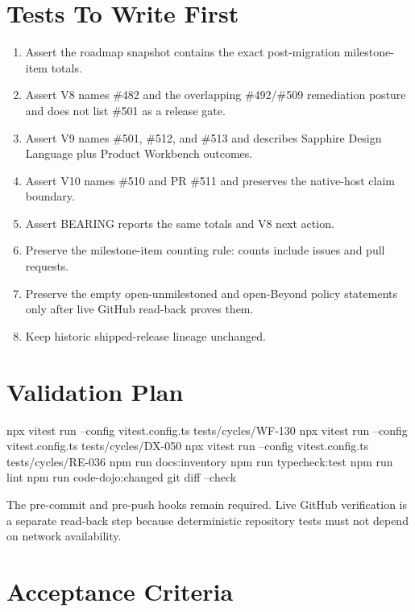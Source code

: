 \section{Tests To Write First}\label{record-249-tests-to-write-first}

\begin{enumerate}
\def\labelenumi{\arabic{enumi}.}
\tightlist
\item
  Assert the roadmap snapshot contains the exact post-migration milestone-item totals.
\item
  Assert V8 names \#482 and the overlapping \#492/\#509 remediation posture and does not list \#501 as a release gate.
\item
  Assert V9 names \#501, \#512, and \#513 and describes Sapphire Design Language plus Product Workbench outcomes.
\item
  Assert V10 names \#510 and PR \#511 and preserves the native-host claim boundary.
\item
  Assert BEARING reports the same totals and V8 next action.
\item
  Preserve the milestone-item counting rule: counts include issues and pull requests.
\item
  Preserve the empty open-unmilestoned and open-Beyond policy statements only after live GitHub read-back proves them.
\item
  Keep historic shipped-release lineage unchanged.
\end{enumerate}

\section{Validation Plan}\label{record-249-validation-plan}

\begin{CodeBlock}
npx vitest run --config vitest.config.ts tests/cycles/WF-130
npx vitest run --config vitest.config.ts tests/cycles/DX-050
npx vitest run --config vitest.config.ts tests/cycles/RE-036
npm run docs:inventory
npm run typecheck:test
npm run lint
npm run code-dojo:changed
git diff --check
\end{CodeBlock}

The pre-commit and pre-push hooks remain required. Live GitHub verification is a separate read-back step because deterministic repository tests must not depend on network availability.

\section{Acceptance Criteria}\label{record-249-acceptance-criteria}

